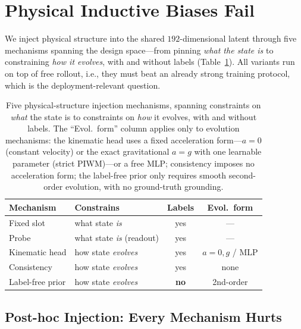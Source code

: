 \section{Physical Inductive Biases Fail}
\label{sec:fails}

We inject physical structure into the shared $192$-dimensional latent through five mechanisms spanning the design space---from pinning \emph{what the state is} to constraining \emph{how it evolves}, with and without labels (Table~\ref{tab:mechanisms}). All variants run on top of free rollout, i.e., they must beat an already strong training protocol, which is the deployment-relevant question.

\begin{table}[t]
\centering
\small
\begin{tabular}{@{}p{2.0cm}p{2.4cm}cc@{}}
\toprule
Mechanism & Constrains & Labels & Evol.\ form \\
\midrule
Fixed slot & what state \emph{is} & yes & --- \\
Probe & what state \emph{is} (readout) & yes & --- \\
Kinematic head & how state \emph{evolves} & yes & $a{=}0,g$ / MLP \\
Consistency & how state \emph{evolves} & yes & none \\
Label-free prior & how state \emph{evolves} & \textbf{no} & 2nd-order \\
\bottomrule
\end{tabular}
\caption{Five physical-structure injection mechanisms, spanning constraints on \emph{what} the state is to constraints on \emph{how} it evolves, with and without labels. The ``Evol.\ form'' column applies only to evolution mechanisms: the kinematic head uses a fixed acceleration form---$a{=}0$ (constant velocity) or the exact gravitational $a{=}g$ with one learnable parameter (strict PIWM)---or a free MLP; consistency imposes no acceleration form; the label-free prior only requires smooth second-order evolution, with no ground-truth grounding.}
\label{tab:mechanisms}
\end{table}

\subsection{Post-hoc Injection: Every Mechanism Hurts}
\label{sec:posthoc}

